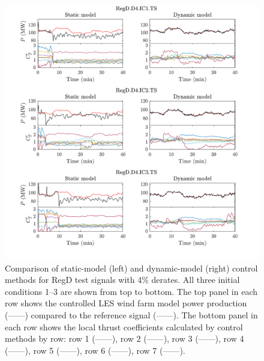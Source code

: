 \begin{figure}[h!]
\begin{center}
\includegraphics[width=\textwidth]{./fig/f6.pdf}
\end{center}
\caption{\label{fig:reg_d_4d} Comparison of static-model (left) and dynamic-model (right) control methods for RegD test signals with 4\% derates. All three initial conditions 1--3 are shown from top to bottom. The top panel in each row shows the controlled LES wind farm model power production (------) compared to the reference signal ({\color{red}------}). The bottom panel in each row shows the local thrust coefficients calculated by control methods by row: row  1 ({\color{co1}------}), row  2 ({\color{co2}------}), row  3 ({\color{co3}------}), row  4 ({\color{co4}------}), row  5 ({\color{co5}------}), row  6 ({\color{co6}------}), row  7 ({\color{co7}------}).}\end{figure}

\clearpage

